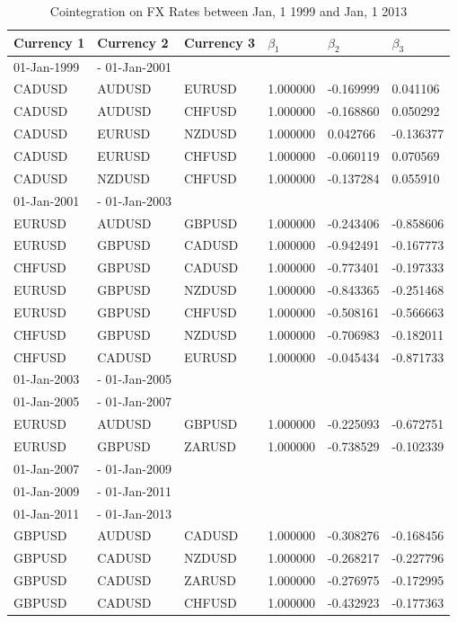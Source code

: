 \documentclass[11pt,a4,twosided,singlespacing,titlepagenumber=on]{scrreprt}
\numberwithin{equation}{chapter} %
\theoremstyle{remark}
\begin{document}
\begin{table}[H]
\centering
\begin{tabular}{llllll}
Currency 1      & Currency 2 & Currency 3 & $\beta_1$ & $\beta_2$ & $\beta_3$ \\ 
\hline
01-Jan-1999 &- 01-Jan-2001 \\
\hline
CADUSD & AUDUSD & EURUSD & 1.000000& -0.169999& 0.041106 \\
CADUSD & AUDUSD & CHFUSD & 1.000000& -0.168860& 0.050292 \\
CADUSD & EURUSD & NZDUSD & 1.000000& 0.042766& -0.136377 \\
CADUSD & EURUSD & CHFUSD & 1.000000& -0.060119& 0.070569 \\
CADUSD & NZDUSD & CHFUSD & 1.000000& -0.137284& 0.055910 \\
\hline
01-Jan-2001 &- 01-Jan-2003 \\
\hline
EURUSD & AUDUSD & GBPUSD & 1.000000& -0.243406& -0.858606 \\
EURUSD & GBPUSD & CADUSD & 1.000000& -0.942491& -0.167773 \\
CHFUSD & GBPUSD & CADUSD & 1.000000& -0.773401& -0.197333 \\
EURUSD & GBPUSD & NZDUSD & 1.000000& -0.843365& -0.251468 \\
EURUSD & GBPUSD & CHFUSD & 1.000000& -0.508161& -0.566663 \\
CHFUSD & GBPUSD & NZDUSD & 1.000000& -0.706983& -0.182011 \\
CHFUSD & CADUSD & EURUSD & 1.000000& -0.045434& -0.871733 \\
\hline
01-Jan-2003 &- 01-Jan-2005 \\
\hline
01-Jan-2005 &- 01-Jan-2007 \\
\hline
EURUSD & AUDUSD & GBPUSD & 1.000000& -0.225093& -0.672751 \\
EURUSD & GBPUSD & ZARUSD & 1.000000& -0.738529& -0.102339 \\
\hline
01-Jan-2007 &- 01-Jan-2009 \\
\hline
01-Jan-2009 &- 01-Jan-2011 \\
\hline
01-Jan-2011 &- 01-Jan-2013 \\
\hline
GBPUSD & AUDUSD & CADUSD & 1.000000& -0.308276& -0.168456 \\
GBPUSD & CADUSD & NZDUSD & 1.000000& -0.268217& -0.227796 \\
GBPUSD & CADUSD & ZARUSD & 1.000000& -0.276975& -0.172995 \\
GBPUSD & CADUSD & CHFUSD & 1.000000& -0.432923& -0.177363 \\
\hline
\end{tabular}
\caption{Cointegration on FX Rates between Jan, 1 1999 and Jan, 1 2013}
\label{coint_fx}
\end{table}
\end{document}
